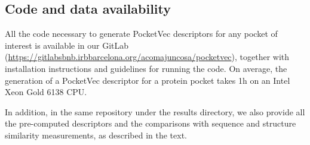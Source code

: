 \subsection{Code and data availability}
\label{PocketVec_Code}

All the code necessary to generate PocketVec descriptors for any pocket of interest is available in our GitLab (\hyperlink{https://gitlabsbnb.irbbarcelona.org/acomajuncosa/pocketvec}{https://gitlabsbnb.irbbarcelona.org/acomajuncosa/pocketvec}), together with installation instructions and guidelines for running the code. On average, the generation of a PocketVec descriptor for a protein pocket takes 1h on an Intel Xeon Gold 6138 CPU.

In addition, in the same repository under the results directory, we also provide all the pre-computed descriptors and the comparisons with sequence and structure similarity measurements, as described in the text.



